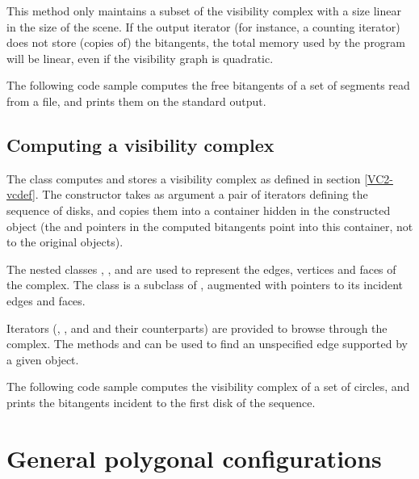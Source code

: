 This method only maintains a subset of the visibility complex with a size
linear in the size of the scene. If the output iterator (for instance, a
counting iterator) does not store (copies of) the bitangents, the total
memory used by the program will be linear, even if the visibility graph is
quadratic.

The following code sample computes the free bitangents of a set of segments
read from a file, and prints them on the standard output.


\subsection{Computing a visibility complex}

The class  computes and stores a
visibility complex as defined in section \ref{VC2-vcdef}. The constructor
takes as argument a pair of iterators defining the sequence of disks, and
copies them into a container hidden in the constructed object (the
 and  pointers in the computed
bitangents point into this container, not to the original objects).

The nested classes ,
, and
 are used to represent the
edges, vertices and faces of the complex. The class  is a
subclass of , augmented with pointers to
its incident edges and faces.

Iterators (, ,  and
 and their  counterparts) are provided to
browse through the complex. The methods  and
 can be used to find an unspecified edge supported by a
given object.

The following code sample computes the visibility complex of a set of
circles, and prints the bitangents incident to the first disk of the
sequence.




\section{General polygonal configurations}

